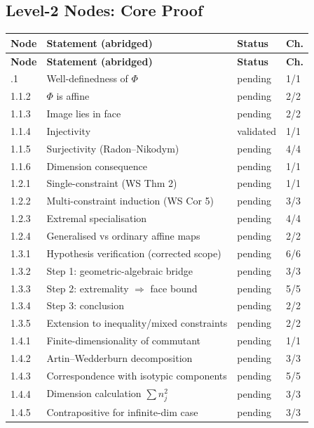 \documentclass[11pt,a4paper]{article}
\theoremstyle{plain}
\theoremstyle{definition}
\theoremstyle{remark}
\begin{document}
\subsection{Level-2 Nodes: Core Proof}

\begin{longtable}{lp{6cm}ll}
\toprule
\textbf{Node} & \textbf{Statement (abridged)} & \textbf{Status} & \textbf{Ch.} \\
\midrule
\endfirsthead
\toprule
\textbf{Node} & \textbf{Statement (abridged)} & \textbf{Status} & \textbf{Ch.} \\
\midrule
\endhead
\bottomrule
\endlastfoot
1.1.1 & Well-definedness of $\Phi$ & pending & 1/1 \\
1.1.2 & $\Phi$ is affine & pending & 2/2 \\
1.1.3 & Image lies in face & pending & 2/2 \\
1.1.4 & Injectivity & validated & 1/1 \\
1.1.5 & Surjectivity (Radon--Nikodym) & pending & 4/4 \\
1.1.6 & Dimension consequence & pending & 1/1 \\
\midrule
1.2.1 & Single-constraint (WS Thm 2) & pending & 1/1 \\
1.2.2 & Multi-constraint induction (WS Cor 5) & pending & 3/3 \\
1.2.3 & Extremal specialisation & pending & 4/4 \\
1.2.4 & Generalised vs ordinary affine maps & pending & 2/2 \\
\midrule
1.3.1 & Hypothesis verification (corrected scope) & pending & 6/6 \\
1.3.2 & Step 1: geometric-algebraic bridge & pending & 3/3 \\
1.3.3 & Step 2: extremality $\Rightarrow$ face bound & pending & 5/5 \\
1.3.4 & Step 3: conclusion & pending & 2/2 \\
1.3.5 & Extension to inequality/mixed constraints & pending & 2/2 \\
\midrule
1.4.1 & Finite-dimensionality of commutant & pending & 1/1 \\
1.4.2 & Artin--Wedderburn decomposition & pending & 3/3 \\
1.4.3 & Correspondence with isotypic components & pending & 5/5 \\
1.4.4 & Dimension calculation $\sum n_j^2$ & pending & 3/3 \\
1.4.5 & Contrapositive for infinite-dim case & pending & 3/3 \\
\end{longtable}
\end{document}
